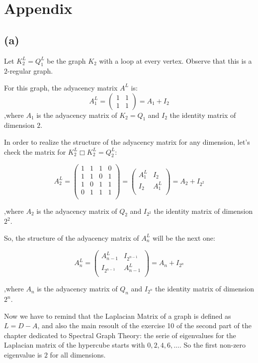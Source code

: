 \documentclass{article}
\begin{document}
\newpage
\section*{Appendix}

\subsection*{(a)}

\noindent Let $K^{L}_{2} = Q^{L}_{1}$ be the graph $K_2$ with a loop at every vertex. Observe that this is a $2$-regular graph.

\noindent For this graph, the adyacency matrix $A^{L}$ is: 
$$
A^{L}_{1} = 
    \begin{pmatrix}
    1 & 1 \\
    1 & 1
    \end{pmatrix}
    = A_{1} + I_{2}
$$ 
\noindent ,where $A_{1}$ is the adyacency matrix of $K_2 = Q_1$ and $I_2$ the identity matrix of dimension $2$.

\noindent In order to realize the structure of the adyacency matrix for any dimension, let's check the matrix for $K^{L}_{2} \Box K^{L}_{2} = Q^{L}_{2}$:

$$
A^{L}_{2} = 
    \begin{pmatrix}
    1 & 1 & 1 & 0\\
    1 & 1 & 0 & 1\\
    1 & 0 & 1 & 1\\
    0 & 1 & 1 & 1\\
    \end{pmatrix}
    = 
    \begin{pmatrix}
    A^{L}_{1} & I_2\\
    I_2 & A^{L}_{1}\\
    \end{pmatrix}
    = A_{2} + I_{2^2}
$$ 

\noindent ,where $A_{2}$ is the adyacency matrix of $Q_2$ and $I_{2^2}$ the identity matrix of dimension $2^2$.

\noindent So, the structure of the adyacency matrix of $A^{L}_{n}$ will be the next one:

$$
A^{L}_{n} = 
    \begin{pmatrix}
    A^{L}_{n-1} & I_{2^{n-1}}\\
    I_{2^{n-1}} & A^{L}_{n-1}\\
    \end{pmatrix}
    = A_{n} + I_{2^n}
$$ 

\noindent ,where $A_{n}$ is the adyacency matrix of $Q_n$ and $I_{2^{n}}$ the identity matrix of dimension $2^n$.


\noindent Now we have to remind that the Laplacian Matrix of a graph is defined as $L = D - A$, and also the main resoult of the exercise 10 of the second part of the chapter dedicated to Spectral Graph Theory: the serie of eigenvalues for the Laplacian matrix of the hypercube starts with $0, 2, 4, 6, ...$. So the first non-zero eigenvalue is $2$ for all dimensions.
\end{document}
